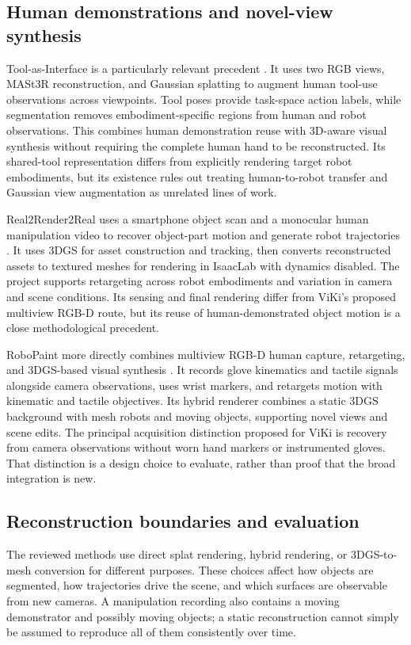 \subsection{Human demonstrations and novel-view synthesis}

Tool-as-Interface is a particularly relevant precedent \cite{toolif}. It uses
two RGB views, MASt3R reconstruction, and Gaussian splatting to augment human
tool-use observations across viewpoints. Tool poses provide task-space action
labels, while segmentation removes embodiment-specific regions from human
and robot observations. This combines human demonstration reuse with 3D-aware
visual synthesis without requiring the complete human hand to be reconstructed.
Its shared-tool representation differs from explicitly rendering target robot
embodiments, but its existence rules out treating human-to-robot transfer and
Gaussian view augmentation as unrelated lines of work.

Real2Render2Real uses a smartphone object scan and a monocular human
manipulation video to recover object-part motion and generate robot trajectories
\cite{real2render2real}. It uses 3DGS for asset construction and tracking,
then converts reconstructed assets to textured meshes for rendering in
IsaacLab with dynamics disabled. The project supports retargeting across robot
embodiments and variation in camera and scene conditions. Its sensing and final
rendering differ from ViKi's proposed multiview RGB-D route, but its reuse of
human-demonstrated object motion is a close methodological precedent.

RoboPaint more directly combines multiview RGB-D human capture, retargeting,
and 3DGS-based visual synthesis \cite{robopaint}. It records glove kinematics
and tactile signals alongside camera observations, uses wrist markers, and
retargets motion with kinematic and tactile objectives. Its hybrid renderer
combines a static 3DGS background with mesh robots and moving objects, supporting
novel views and scene edits. The principal acquisition distinction proposed
for ViKi is recovery from camera observations without worn hand markers or
instrumented gloves. That distinction is a design choice to evaluate, rather
than proof that the broad integration is new.

\subsection{Reconstruction boundaries and evaluation}

The reviewed methods use direct splat rendering, hybrid rendering, or
3DGS-to-mesh conversion for different purposes. These choices affect how
objects are segmented, how trajectories drive the scene, and which surfaces
are observable from new cameras. A manipulation recording also contains a
moving demonstrator and possibly moving objects; a static reconstruction
cannot simply be assumed to reproduce all of them consistently over time.

